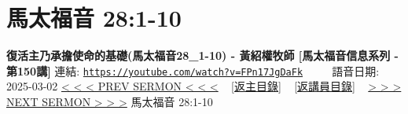 \documentclass{book}
\begin{document}
\section{馬太福音 28:1-10}
\label{sec:FPn17JgDaFk}
\textbf{復活主乃承擔使命的基礎(馬太福音28\_1-10) - 黃紹權牧師  [馬太福音信息系列 - 第150講]}
\newline
\newline
連結: \href{https://youtube.com/watch?v=FPn17JgDaFk}{\texttt{https://youtube.com/watch?v=FPn17JgDaFk}} ~~~~ 語音日期: 2025-03-02
\newline
\newline
\hyperref[sec:XsHcQyRDgsU]{< < < PREV SERMON < < <}
~
\hyperlink{toc}{[返主目錄]}
~
\hyperref[ch:preacher16]{[返講員目錄]}
~
\hyperref[sec:zNZ0_TjZo3U]{> > > NEXT SERMON > > >}
\newline
\newline
馬太福音 28:1-10
\newline
\end{document}
